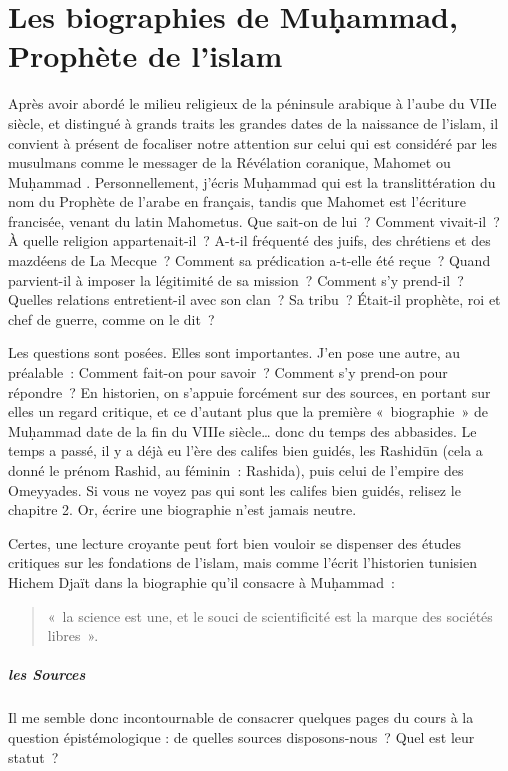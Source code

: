 \chapter{Les biographies de Muḥammad, Prophète de l'islam}

Après avoir abordé le milieu religieux de la péninsule arabique à l'aube
du VIIe siècle, et distingué à grands traits les grandes dates de la
naissance de l'islam, il convient à présent de focaliser notre attention
sur celui qui est considéré par les musulmans comme le messager de la
Révélation coranique, Mahomet ou Muḥammad . Personnellement,
j'écris Muḥammad qui est la translittération du nom du Prophète de
l'arabe en français, tandis que Mahomet est l'écriture francisée, venant
du latin Mahometus. Que sait-on de lui~? Comment vivait-il~? À quelle
religion appartenait-il~? A-t-il fréquenté des juifs, des chrétiens et
des mazdéens de La Mecque~? Comment sa prédication a-t-elle été reçue~?
Quand parvient-il à imposer la légitimité de sa mission~? Comment s'y
prend-il~? Quelles relations entretient-il avec son clan~? Sa tribu~?
Était-il prophète, roi et chef de guerre, comme on le dit~?

Les questions sont posées. Elles sont importantes. J'en pose une autre,
au préalable~: Comment fait-on pour savoir~? Comment s'y prend-on pour
répondre~? En historien, on s'appuie forcément sur des sources, en
portant sur elles un regard critique, et ce d'autant plus que la
première «~biographie~» de Muḥammad date de la fin du VIIIe
siècle\ldots{} donc du temps des abbasides. Le temps a passé, il y a
déjà eu l'ère des califes bien guidés, les Rashidūn (cela a donné le
prénom Rashid, au féminin~: Rashida), puis celui de l'empire des
Omeyyades. Si vous ne voyez pas qui sont les califes bien guidés,
relisez le chapitre 2. Or, écrire une biographie n'est jamais neutre.

Certes, une lecture croyante peut fort bien vouloir se dispenser des
études critiques sur les fondations de l'islam, mais comme l'écrit
l'historien tunisien Hichem Djaït dans la biographie qu'il consacre à
Muḥammad~: 
\begin{quote}
  «~la science est une, et le souci de scientificité est la
marque des sociétés libres~».  
\end{quote}


\paragraph{les Sources} Il me semble donc incontournable de consacrer quelques pages du cours à
la question épistémologique : de quelles sources disposons-nous~? Quel
est leur statut~?


